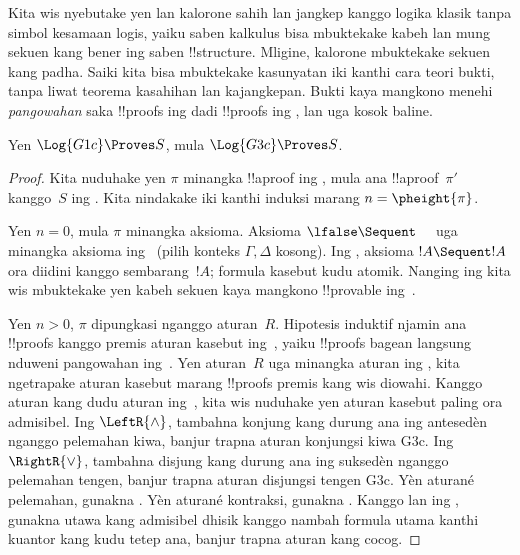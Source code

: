 \documentclass[../../../include/open-logic-section]{subfiles}
\begin{document}


Kita wis nyebutake yen  lan  kalorone sahih lan
jangkep kanggo logika klasik tanpa simbol kesamaan logis, yaiku saben kalkulus bisa mbuktekake kabeh
lan mung sekuen kang bener ing saben !!{structure}. Mligine, kalorone
mbuktekake sekuen kang padha. Saiki kita bisa mbuktekake kasunyatan iki
kanthi cara teori bukti, tanpa liwat teorema kasahihan lan kajangkepan.
Bukti kaya mangkono menehi \emph{pangowahan} saka !!{proof}s ing
 dadi !!{proof}s ing , lan uga kosok baline.

\begin{prop}
Yen $\Log{G1c} \Proves S$, mula $\Log{G3c} \Proves S$.
\end{prop}

\begin{proof}
  Kita nuduhake yen $\pi$ minangka !!a{proof} ing , mula ana
  !!a{proof}~$\pi'$ kanggo~$S$ ing .
  Kita nindakake iki kanthi induksi marang $n = \pheight{\pi}$.

Yen $n = 0$, mula $\pi$ minangka aksioma. Aksioma
$\lfalse \Sequent \quad$ uga minangka aksioma ing~
(pilih konteks $\Gamma, \Delta$ kosong). Ing , aksioma
$!A \Sequent !A$ ora diidini kanggo sembarang~$!A$;
formula kasebut kudu atomik. Nanging ing 
kita wis mbuktekake yen kabeh sekuen kaya mangkono !!{provable}
ing~.

Yen $n>0$, $\pi$ dipungkasi nganggo aturan~$R$.
Hipotesis induktif njamin ana !!{proof}s kanggo premis aturan kasebut
ing~, yaiku !!{proof}s bagean langsung nduweni pangowahan
ing~. Yen aturan~$R$ uga minangka aturan ing ,
kita ngetrapake aturan kasebut marang !!{proof}s premis kang wis diowahi.
Kanggo aturan kang dudu aturan ing~, kita wis nuduhake
yen aturan kasebut paling ora admisibel. Ing $\LeftR{\land}$, tambahna konjung kang durung ana ing
antesedèn nganggo pelemahan kiwa, banjur trapna aturan konjungsi
kiwa G3c. Ing $\RightR{\lor}$, tambahna disjung kang durung ana ing
suksedèn nganggo pelemahan tengen, banjur trapna aturan disjungsi
tengen G3c.
Yèn aturané pelemahan,
gunakna . Yèn aturané kontraksi,
gunakna .
Kanggo \LeftR{\lforall} lan \RightR{\lexists} ing ,
gunakna \LeftR{\Weakening} utawa \RightR{\Weakening} kang admisibel
dhisik kanggo nambah formula utama kanthi kuantor kang kudu tetep ana,
banjur trapna aturan  kang cocog.
\end{proof}
\end{document}
